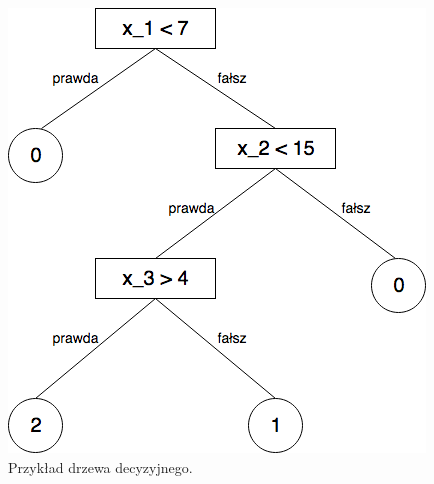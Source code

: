 \begin{figure}[ht!]
\centering
\includegraphics[scale=0.55]{res/dt1.png}
\caption[Caption for LOF]{Przykład drzewa decyzyjnego.\label{dt1image}}
\end{figure} 

